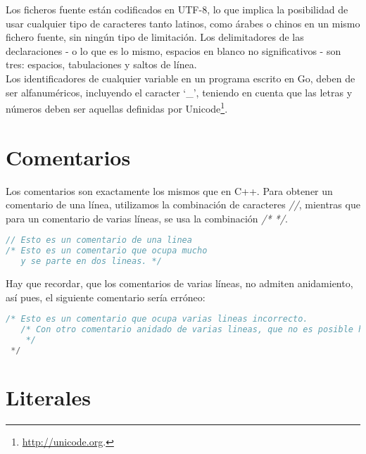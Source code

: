 Los ficheros fuente están codificados en UTF-8, lo que implica la posibilidad de
usar cualquier tipo de caracteres tanto latinos, como árabes o chinos en un
mismo fichero fuente, sin ningún tipo de limitación. Los delimitadores de las
declaraciones - o lo que es lo mismo, espacios en blanco no significativos - son
tres: espacios, tabulaciones y saltos de línea.\\

Los identificadores de cualquier variable en un programa escrito en Go, deben de
ser alfanuméricos, incluyendo el caracter `\_', teniendo en cuenta que las
letras y números deben ser aquellas definidas por
Unicode\footnote{\url{http://unicode.org}.}.

\section{Comentarios}

Los comentarios son exactamente los mismos que en C++. Para obtener un
comentario de una línea, utilizamos la combinación de caracteres \emph{//}, mientras
que para un comentario de varias líneas, se usa la combinación \emph{/* */}.

\begin{minipage}{17.1cm}
\begin{lstlisting}[language=go,numbers=none, caption=Comentarios correctos,
label=comentarioscorrectos]
// Esto es un comentario de una linea
/* Esto es un comentario que ocupa mucho
   y se parte en dos lineas. */
\end{lstlisting}
\end{minipage}

Hay que recordar, que los comentarios de varias líneas, no admiten anidamiento,
así pues, el siguiente comentario sería erróneo:

\begin{minipage}{17.1cm}
\begin{lstlisting}[language=go,numbers=none, caption=Comentario incorrecto,
label=comentarioincorrecto]
/* Esto es un comentario que ocupa varias lineas incorrecto.
   /* Con otro comentario anidado de varias lineas, que no es posible hacer.
   	*/
 */
\end{lstlisting}
\end{minipage}

\section{Literales}

